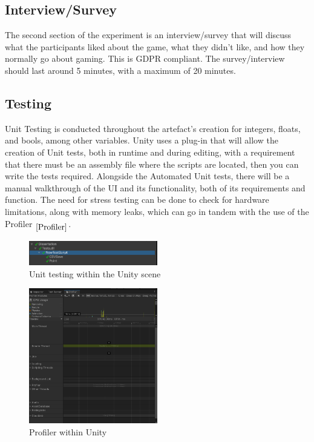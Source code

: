 \documentclass[conference]{IEEEtran}
\begin{document}
\subsection{Interview/Survey}
The second section of the experiment is an interview/survey that will discuss what the participants liked about the game, what they didn't like, and how they normally go about gaming. This is GDPR compliant. The survey/interview should last around 5 minutes, with a maximum of 20 minutes.

\subsection{Testing}
Unit Testing is conducted throughout the artefact's creation for integers, floats, and bools, among other variables. Unity uses a plug-in that will allow the creation of Unit tests, both in runtime and during editing, with a requirement that there must be an assembly file where the scripts are located, then you can write the tests required. Alongside the Automated Unit tests, there will be a manual walkthrough of the UI and its functionality, both of its requirements and function. The need for stress testing can be done to check for hardware limitations, along with memory leaks, which can go in tandem with the use of the Profiler $_{\ref{Profiler}}$.
\begin{figure}[H]
\begin{center}
\includegraphics[width = 0.5\textwidth, ]{Unittesting}
\caption{Unit testing within the Unity scene}
\label{figure3}
\end{center}
\end{figure}

\begin{figure}[H]
\begin{center}
\includegraphics[width = 0.5\textwidth, ]{Profiler}
\caption{Profiler within Unity}
\label{Profiler}
\end{center}
\end{figure}
\end{document}
